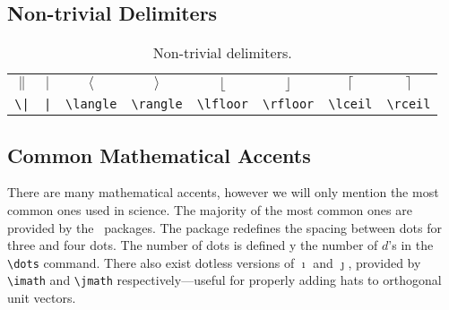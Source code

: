 \subsection{Non-trivial Delimiters}
%
\begin{table}[!htbp]
    \centering
    \caption{Non-trivial delimiters.}
    \label{t:ntd}
    \begin{tabular}{cccccccc}
        $\|$ & $|$ & $\langle$ & $\rangle$ & $\lfloor$ & $\rfloor$ & $\lceil$ & $\rceil$ \\
        \verb+\|+ & \verb+|+ & \verb|\langle| & \verb|\rangle| & \verb|\lfloor| & \verb|\rfloor| & \verb|\lceil| & \verb|\rceil| \\
    \end{tabular}
\end{table}
%
\subsection{Common Mathematical Accents}
%
There are many mathematical accents, however we will only mention the
most common ones used in science.  The majority of the most common
ones are provided by the \AmSTeX~packages.  The 
package redefines the spacing between dots for three and four dots.
The number of dots is defined y the number of $d$'s in the
\verb|\dots| command.  There also exist dotless versions of $\imath$
and $\jmath$, provided by \verb|\imath| and \verb|\jmath|
respectively---useful for properly adding hats to orthogonal unit
vectors.

